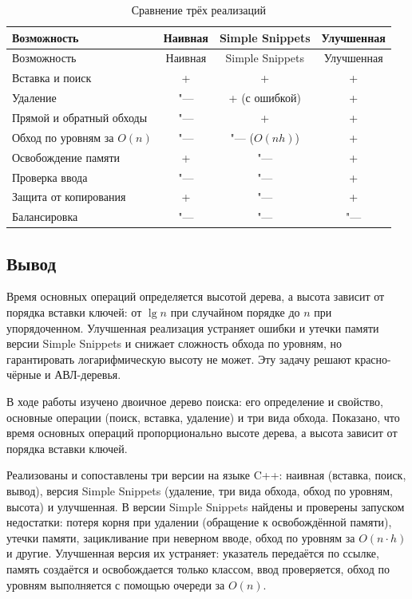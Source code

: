 \documentclass[otchet]{SCWorks}
\begin{document}
\begin{longtable}{|p{}|c|c|c|}
  \caption{Сравнение трёх реализаций}
  \label{tab:compare} \\
  \hline
  Возможность & Наивная & Simple Snippets & Улучшенная \\ \hline
  \endfirsthead
  \hline
  Возможность & Наивная & Simple Snippets & Улучшенная \\ \hline
  \endhead
  Вставка и поиск                & + & + & + \\ \hline
  Удаление                       & "--- & + (с ошибкой) & + \\ \hline
  Прямой и обратный обходы       & "--- & + & + \\ \hline
  Обход по уровням за $O(n)$     & "--- & "--- ($O(nh)$) & + \\ \hline
  Освобождение памяти            & + & "--- & + \\ \hline
  Проверка ввода                 & "--- & "--- & + \\ \hline
  Защита от копирования          & + & "--- & + \\ \hline
  Балансировка                   & "--- & "--- & "--- \\ \hline
\end{longtable}

\subsection{Вывод}

Время основных операций определяется высотой дерева, а высота зависит от
порядка вставки ключей: от $\lg n$ при случайном порядке до $n$ при
упорядоченном. Улучшенная реализация устраняет ошибки и утечки памяти
версии Simple Snippets и снижает сложность обхода по уровням, но
гарантировать логарифмическую высоту не может. Эту задачу решают
красно-чёрные и АВЛ-деревья.

\conclusion

В ходе работы изучено двоичное дерево поиска: его определение и свойство,
основные операции (поиск, вставка, удаление) и три вида обхода. Показано,
что время основных операций пропорционально высоте дерева, а высота зависит
от порядка вставки ключей.
 
Реализованы и сопоставлены три версии на языке C++: наивная (вставка,
поиск, вывод), версия Simple Snippets (удаление, три вида обхода, обход по
уровням, высота) и улучшенная. В версии Simple Snippets найдены и проверены
запуском недостатки: потеря корня при удалении (обращение к освобождённой
памяти), утечки памяти, зацикливание при неверном вводе, обход по уровням за
$O(n \cdot h)$ и другие. Улучшенная версия их устраняет: указатель передаётся
по ссылке, память создаётся и освобождается только классом, ввод
проверяется, обход по уровням выполняется с помощью очереди за $O(n)$.
 
\end{document}
